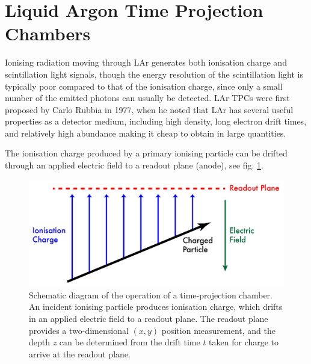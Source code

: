 \section{Liquid Argon Time Projection Chambers}
Ionising radiation moving through \ac{LAr} generates both ionisation charge and scintillation light signals, though the energy resolution of the scintillation light is typically poor compared to that of the ionisation charge, since only a small number of the emitted photons can usually be detected\citep{Aprile2006}. \aclp{LAr TPC} were first proposed by Carlo Rubbia in 1977\citep{Rubbia1977}, when he noted that \ac{LAr} has several useful properties as a detector medium, including high density, long electron drift times, and relatively high abundance making it cheap to obtain in large quantities.

The ionisation charge produced by a primary ionising particle can be drifted through an applied electric field to a readout plane (anode), see fig. \ref{fig:tpc-schematic}.

\begin{figure}
\centering
\includegraphics[width=\textwidth]{chapters/detectorphysics_images/TPC-Schematic}
\caption[Schematic diagram of the operation of a time-projection chamber]{\label{fig:tpc-schematic}Schematic diagram of the operation of a time-projection chamber. An incident ionising particle produces ionisation charge, which drifts in an applied electric field to a readout plane. The readout plane provides a two-dimensional $(x,y)$ position measurement, and the depth $z$ can be determined from the drift time $t$ taken for charge to arrive at the readout plane.}
\end{figure}


